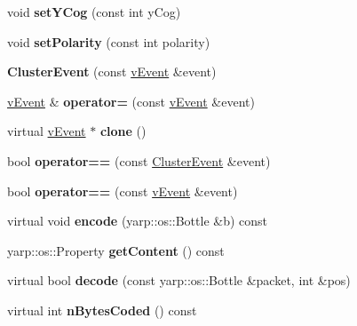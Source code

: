 \begin{DoxyCompactItemize}
\item 
void {\bfseries set\+Y\+Cog} (const int y\+Cog)\hypertarget{classev_1_1ClusterEvent_aa6703fbe78bffbd21ad2bacc9bd3d3b8}{}\label{classev_1_1ClusterEvent_aa6703fbe78bffbd21ad2bacc9bd3d3b8}

\item 
void {\bfseries set\+Polarity} (const int polarity)\hypertarget{classev_1_1ClusterEvent_aacd9f0d278ca277b22ad8db3e8ad67db}{}\label{classev_1_1ClusterEvent_aacd9f0d278ca277b22ad8db3e8ad67db}

\item 
{\bfseries Cluster\+Event} (const \hyperlink{classev_1_1vEvent}{v\+Event} \&event)\hypertarget{classev_1_1ClusterEvent_abe86469c963b2f313c57224a1c8a770d}{}\label{classev_1_1ClusterEvent_abe86469c963b2f313c57224a1c8a770d}

\item 
\hyperlink{classev_1_1vEvent}{v\+Event} \& {\bfseries operator=} (const \hyperlink{classev_1_1vEvent}{v\+Event} \&event)\hypertarget{classev_1_1ClusterEvent_a2849ce0d84c9a8a014d12d1a3d4718d6}{}\label{classev_1_1ClusterEvent_a2849ce0d84c9a8a014d12d1a3d4718d6}

\item 
virtual \hyperlink{classev_1_1vEvent}{v\+Event} $\ast$ {\bfseries clone} ()\hypertarget{classev_1_1ClusterEvent_a32b61af5a3bab167c98fa680694b1dfb}{}\label{classev_1_1ClusterEvent_a32b61af5a3bab167c98fa680694b1dfb}

\item 
bool {\bfseries operator==} (const \hyperlink{classev_1_1ClusterEvent}{Cluster\+Event} \&event)\hypertarget{classev_1_1ClusterEvent_a4ff5207487dde56afec4970d44ab3c80}{}\label{classev_1_1ClusterEvent_a4ff5207487dde56afec4970d44ab3c80}

\item 
bool {\bfseries operator==} (const \hyperlink{classev_1_1vEvent}{v\+Event} \&event)\hypertarget{classev_1_1ClusterEvent_a8c2ddb8563caf4604cca97a9d29510e7}{}\label{classev_1_1ClusterEvent_a8c2ddb8563caf4604cca97a9d29510e7}

\item 
virtual void {\bfseries encode} (yarp\+::os\+::\+Bottle \&b) const \hypertarget{classev_1_1ClusterEvent_ab90a45903498a88369164711e5fc9ba3}{}\label{classev_1_1ClusterEvent_ab90a45903498a88369164711e5fc9ba3}

\item 
yarp\+::os\+::\+Property {\bfseries get\+Content} () const \hypertarget{classev_1_1ClusterEvent_a95be2a982e74b261768d1150fb0fd12d}{}\label{classev_1_1ClusterEvent_a95be2a982e74b261768d1150fb0fd12d}

\item 
virtual bool {\bfseries decode} (const yarp\+::os\+::\+Bottle \&packet, int \&pos)\hypertarget{classev_1_1ClusterEvent_abe3ccfd94ecded904beb4e126e448c9f}{}\label{classev_1_1ClusterEvent_abe3ccfd94ecded904beb4e126e448c9f}

\item 
virtual int {\bfseries n\+Bytes\+Coded} () const \hypertarget{classev_1_1ClusterEvent_ae520fafb58dac573a175abc64eef0467}{}\label{classev_1_1ClusterEvent_ae520fafb58dac573a175abc64eef0467}

\end{DoxyCompactItemize}
